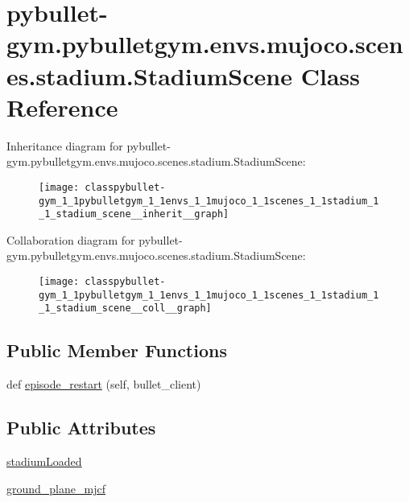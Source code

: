 \hypertarget{classpybullet-gym_1_1pybulletgym_1_1envs_1_1mujoco_1_1scenes_1_1stadium_1_1_stadium_scene}{}\section{pybullet-\/gym.pybulletgym.\+envs.\+mujoco.\+scenes.\+stadium.\+Stadium\+Scene Class Reference}
\label{classpybullet-gym_1_1pybulletgym_1_1envs_1_1mujoco_1_1scenes_1_1stadium_1_1_stadium_scene}


Inheritance diagram for pybullet-\/gym.pybulletgym.\+envs.\+mujoco.\+scenes.\+stadium.\+Stadium\+Scene\+:
\nopagebreak
\begin{figure}[H]
\begin{center}
\leavevmode
\texttt{[image: classpybullet-gym\_1\_1pybulletgym\_1\_1envs\_1\_1mujoco\_1\_1scenes\_1\_1stadium\_1\_1\_stadium\_scene\_\_inherit\_\_graph]}
\end{center}
\end{figure}


Collaboration diagram for pybullet-\/gym.pybulletgym.\+envs.\+mujoco.\+scenes.\+stadium.\+Stadium\+Scene\+:
\nopagebreak
\begin{figure}[H]
\begin{center}
\leavevmode
\texttt{[image: classpybullet-gym\_1\_1pybulletgym\_1\_1envs\_1\_1mujoco\_1\_1scenes\_1\_1stadium\_1\_1\_stadium\_scene\_\_coll\_\_graph]}
\end{center}
\end{figure}
\subsection*{Public Member Functions}
\begin{DoxyCompactItemize}
\item 
def \hyperlink{classpybullet-gym_1_1pybulletgym_1_1envs_1_1mujoco_1_1scenes_1_1stadium_1_1_stadium_scene_a1fb8a254e7a4947205bea14545157ac8}{episode\+\_\+restart} (self, bullet\+\_\+client)
\end{DoxyCompactItemize}
\subsection*{Public Attributes}
\begin{DoxyCompactItemize}
\item 
\hyperlink{classpybullet-gym_1_1pybulletgym_1_1envs_1_1mujoco_1_1scenes_1_1stadium_1_1_stadium_scene_a16e5a8e3db8ddabec3d9e47e8a63d53c}{stadium\+Loaded}
\item 
\hyperlink{classpybullet-gym_1_1pybulletgym_1_1envs_1_1mujoco_1_1scenes_1_1stadium_1_1_stadium_scene_a73c9a6409831d92874319cc7d54618a4}{ground\+\_\+plane\+\_\+mjcf}
\end{DoxyCompactItemize}
